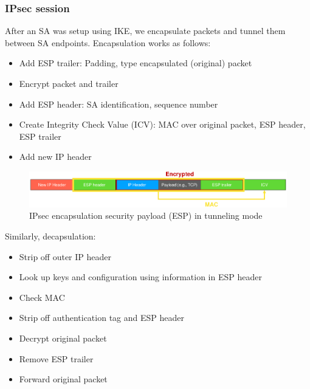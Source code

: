 \documentclass[11pt,oneside,a4paper]{article}
\begin{document}
\subsubsection{IPsec session}

After an SA was setup using IKE, we encapsulate packets and tunnel them between SA endpoints. Encapsulation works as follows:

\vspace{-\topsep}
\begin{itemize}
	\setlength{\itemsep}{0pt}
	\setlength{\parskip}{0pt}
	\item Add ESP trailer: Padding, type encapsulated (original) packet
	\item Encrypt packet and trailer
	\item Add ESP header: SA identification, sequence number
	\item Create Integrity Check Value (ICV): MAC over original packet, ESP	header, ESP trailer
	\item Add new IP header
\end{itemize}
\vspace{-\topsep}

\begin{figure}
	\centering
	\includegraphics[width=0.7\linewidth]{figures/ipsec_encapsulation}
	\caption{IPsec encapsulation security payload (ESP) in tunneling mode}
	\label{fig:ipsecencapsulation}
\end{figure}

\noindent Similarly, decapsulation:

\vspace{-\topsep}
\begin{itemize}
	\setlength{\itemsep}{0pt}
	\setlength{\parskip}{0pt}
	\item Strip off outer IP header
	\item Look up keys and configuration using information in ESP header
	\item Check MAC
	\item Strip off authentication tag and ESP header
	\item Decrypt original packet
	\item Remove ESP trailer
	\item Forward original packet
\end{itemize}
\vspace{-\topsep}
\end{document}
